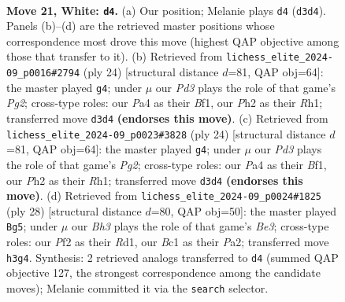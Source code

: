 \documentclass[11pt]{article}
\begin{document}
\clearpage

\begin{figure}[p]\centering
\begin{subfigure}{0.46\textwidth}\centering
\resizebox{\linewidth}{!}{%
\newchessgame
\chessboard[
  setfen={2bqr2k/rp1pppbp/p2n4/3Q4/P1P5/2NP1N1B/1P3P1P/R1B2RK1 w - - 1 21},
  showmover=false,
  pgfstyle=straightmove, color=movearrow, markmove={d3-d4}
]}
\caption{}
\end{subfigure}\hfill
\begin{subfigure}{0.46\textwidth}\centering
\resizebox{\linewidth}{!}{%
\newchessgame
\chessboard[
  setfen={r3k2r/2qbbppp/p2ppn2/1p4B1/3QP2P/2N2P2/PPP3P1/1K1R1B1R w kq - 2 13},
  showmover=false,
  pgfstyle=straightmove, color=movearrow, markmove={g2-g4}
]}
\caption{}
\end{subfigure}
\\[4pt]
\begin{subfigure}{0.46\textwidth}\centering
\resizebox{\linewidth}{!}{%
\newchessgame
\chessboard[
  setfen={r3k2r/2qbbppp/p2ppn2/1p4B1/3QP2P/2N2P2/PPP3P1/1K1R1B1R w kq - 0 13},
  showmover=false,
  pgfstyle=straightmove, color=movearrow, markmove={g2-g4}
]}
\caption{}
\end{subfigure}\hfill
\begin{subfigure}{0.46\textwidth}\centering
\resizebox{\linewidth}{!}{%
\newchessgame
\chessboard[
  setfen={r1b2rk1/pp2bp1p/1nn3p1/q1p1P3/4Q3/2NBBN2/PP3PPP/2KR3R w - - 0 15},
  showmover=false,
  pgfstyle=straightmove, color=movearrow, markmove={e3-g5}
]}
\caption{}
\end{subfigure}
\caption{\textbf{Move 21, White: \texttt{d4}.} (a) Our position; Melanie plays \texttt{d4} (\texttt{d3d4}). Panels (b)--(d) are the retrieved master positions whose correspondence most drove this move (highest QAP objective among those that transfer to it). (b) Retrieved from \texttt{lichess\_elite\_2024-09\_p0016\#2794} (ply 24) [structural distance $d$=81, QAP obj=64]: the master played \texttt{g4}; under $\mu$ our \emph{Pd3} plays the role of that game's \emph{Pg2}; cross-type roles: our \emph{P}a4 as their \emph{B}f1, our \emph{P}h2 as their \emph{R}h1; transferred move \texttt{d3d4} \textbf{(endorses this move)}. (c) Retrieved from \texttt{lichess\_elite\_2024-09\_p0023\#3828} (ply 24) [structural distance $d$=81, QAP obj=64]: the master played \texttt{g4}; under $\mu$ our \emph{Pd3} plays the role of that game's \emph{Pg2}; cross-type roles: our \emph{P}a4 as their \emph{B}f1, our \emph{P}h2 as their \emph{R}h1; transferred move \texttt{d3d4} \textbf{(endorses this move)}. (d) Retrieved from \texttt{lichess\_elite\_2024-09\_p0024\#1825} (ply 28) [structural distance $d$=80, QAP obj=50]: the master played \texttt{Bg5}; under $\mu$ our \emph{Bh3} plays the role of that game's \emph{Be3}; cross-type roles: our \emph{P}f2 as their \emph{R}d1, our \emph{B}c1 as their \emph{P}a2; transferred move \texttt{h3g4}. Synthesis: 2 retrieved analogs transferred to \texttt{d4} (summed QAP objective 127, the strongest correspondence among the candidate moves); Melanie committed it via the \texttt{search} selector.}
\label{fig:thought-m40}
\end{figure}
\end{document}

